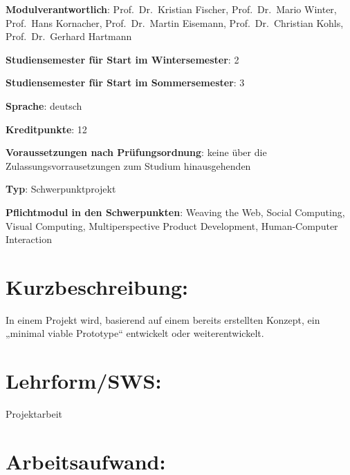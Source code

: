 \begin{modulHead}
\textbf{Modulverantwortlich}: Prof.~Dr.~Kristian
Fischer, Prof.~Dr.~Mario Winter, Prof.~Hans Kornacher, Prof.~Dr.~Martin
Eisemann, Prof.~Dr.~Christian Kohls, Prof.~Dr.~Gerhard
Hartmann
\end{modulHead}
\begin{modulHead}
\textbf{Studiensemester für
Start im Wintersemester}:
2
\end{modulHead}
\begin{modulHead}
\textbf{Studiensemester für Start
im Sommersemester}:
3
\end{modulHead}
\begin{modulHead}
\textbf{Sprache}:
deutsch
\end{modulHead}
\begin{modulHead}
\textbf{Kreditpunkte}:
12
\end{modulHead}
\begin{modulHead}
\textbf{Voraussetzungen nach
Prüfungsordnung}: keine über die Zulassungsvorrausetzungen zum Studium
hinausgehenden
\end{modulHead}
\begin{modulHead}
\textbf{Typ}:
Schwerpunktprojekt
\end{modulHead}
\begin{modulHead}
\textbf{Pflichtmodul
in den Schwerpunkten}: Weaving the Web, Social Computing, Visual
Computing, Multiperspective Product Development, Human-Computer
Interaction
\end{modulHead}


\section*{Kurzbeschreibung:}\label{kurzbeschreibung-3}

In einem Projekt wird, basierend auf einem bereits erstellten Konzept,
ein „minimal viable Prototype`` entwickelt oder weiterentwickelt.

\section*{Lehrform/SWS:}\label{lehrformsws-8}

Projektarbeit

\section*{Arbeitsaufwand:}\label{arbeitsaufwand-9}

